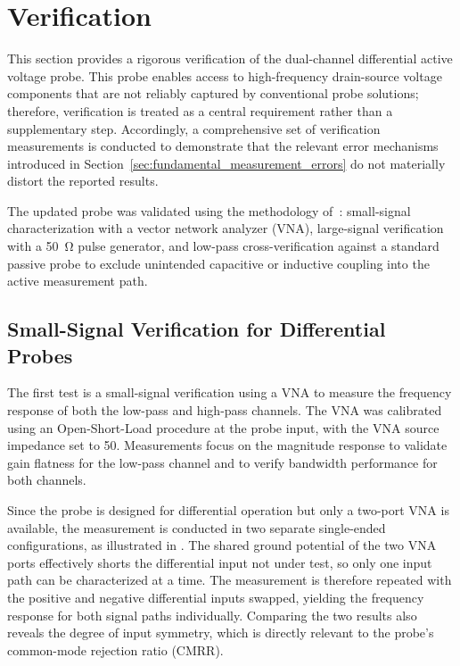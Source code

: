 
\section{Verification}
This section provides a rigorous verification of the dual-channel differential active voltage probe.
This probe enables access to high-frequency drain-source voltage components that are not reliably captured by conventional probe solutions; therefore, verification is treated as a central requirement rather than a supplementary step.
Accordingly, a comprehensive set of verification measurements is conducted to demonstrate that the relevant error mechanisms introduced in Section~\ref{sec:fundamental_measurement_errors} do not materially distort the reported results.

The updated probe was validated using the methodology of~\cite{kragl_active_2025}: small-signal characterization with a vector network analyzer (VNA), large-signal verification with a \SI{50}{\ohm} pulse generator, and low-pass cross-verification against a standard passive probe to exclude unintended capacitive or inductive coupling into the active measurement path.









\subsection*{Small-Signal Verification for Differential Probes}
The first test is a small-signal verification using a VNA to measure the frequency response of both the low-pass and high-pass channels.
The VNA was calibrated using an Open-Short-Load procedure at the probe input, with the VNA source impedance set to \SI{50}{\Omega}.
Measurements focus on the magnitude response to validate gain flatness for the low-pass channel and to verify bandwidth performance for both channels.

Since the probe is designed for differential operation but only a two-port VNA is available, the measurement is conducted in two separate single-ended configurations, as illustrated in .
The shared ground potential of the two VNA ports effectively shorts the differential input not under test, so only one input path can be characterized at a time.
The measurement is therefore repeated with the positive and negative differential inputs swapped, yielding the frequency response for both signal paths individually.
Comparing the two results also reveals the degree of input symmetry, which is directly relevant to the probe's common-mode rejection ratio (CMRR).


